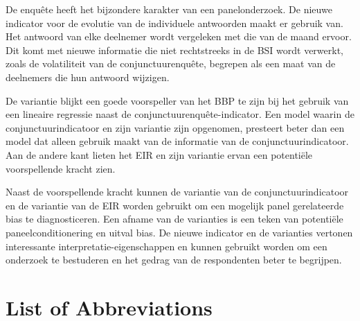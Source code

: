 \documentclass[12pt,a4paper,oneside]{book}
\begin{document}
De enquête heeft het bijzondere karakter van een panelonderzoek. 
De nieuwe indicator voor de evolutie van de individuele antwoorden maakt er gebruik van. Het antwoord van elke deelnemer wordt vergeleken met die van de maand ervoor.
Dit komt met nieuwe informatie die niet rechtstreeks in de BSI wordt verwerkt, zoals de volatiliteit van de conjunctuurenquête, begrepen als een maat van de deelnemers die hun antwoord wijzigen.

De variantie blijkt een goede voorspeller van het BBP te zijn bij het gebruik van een lineaire regressie naast de conjunctuurenquête-indicator. Een model waarin de conjunctuurindicatoor en zijn variantie zijn opgenomen, presteert beter dan een model dat alleen gebruik maakt van de informatie van de conjunctuurindicatoor.
Aan de andere kant lieten het EIR en zijn variantie ervan een potentiële voorspellende kracht zien.

Naast de voorspellende kracht kunnen de variantie van de conjunctuurindicatoor en de variantie van de EIR worden gebruikt om een mogelijk panel gerelateerde bias te diagnosticeren. Een afname van de varianties is een teken van potentiële paneelconditionering en uitval bias.
De nieuwe indicator en de varianties vertonen interessante interpretatie-eigenschappen en kunnen gebruikt worden om een onderzoek te bestuderen en het gedrag van de respondenten beter te begrijpen.






\chapter*{List of Abbreviations}
\end{document}
